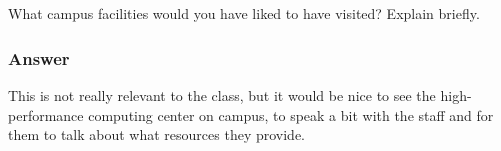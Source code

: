 \documentclass[12pt]{article}
\begin{document}
\subsection{}

What campus facilities would you have liked to have visited? Explain briefly.
\subsubsection{Answer}

This is not really relevant to the class, but it would be nice to see the high-performance computing center on campus, to speak a bit with the staff and for them to talk about what resources they provide.
\end{document}
